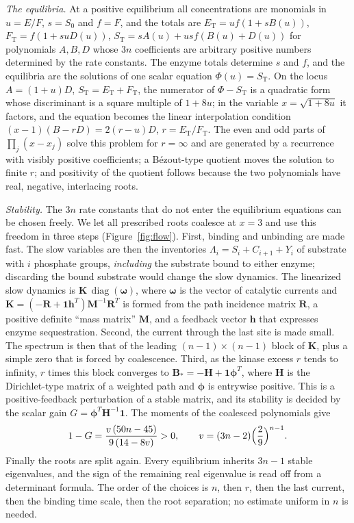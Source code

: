 \documentclass[11pt]{article}
\theoremstyle{plain}
\theoremstyle{definition}
\theoremstyle{remark}
\numberwithin{equation}{section}
\newcommand{\ET}{E_{\mathrm T}}
\newcommand{\FT}{F_{\mathrm T}}
\newcommand{\ST}{S_{\mathrm T}}
\newcommand{\bM}{\mathbf M}
\newcommand{\bR}{\mathbf R}
\newcommand{\bK}{\mathbf K}
\newcommand{\bH}{\mathbf H}
\newcommand{\bB}{\mathbf B}
\newcommand{\one}{\boldsymbol 1}
\newcommand{\bh}{\boldsymbol h}
\newcommand{\bphi}{\boldsymbol\phi}
\newcommand{\bomega}{\boldsymbol\omega}
\DeclareMathOperator{\diag}{diag}
\begin{document}
\emph{The equilibria.} At a positive equilibrium all concentrations are monomials in
\(u=E/F\), \(s=S_0\) and \(f=F\), and the totals are
\(\ET=uf(1+sB(u))\), \(\FT=f(1+suD(u))\), \(\ST=sA(u)+usf(B(u)+D(u))\) for polynomials \(A,B,D\)
whose \(3n\) coefficients are arbitrary positive numbers determined by the rate constants. The
enzyme totals determine \(s\) and \(f\), and the equilibria are the solutions of one scalar
equation \(\Phi(u)=\ST\). On the locus \(A=(1+u)D\), \(\ST=\ET+\FT\), the numerator of
\(\Phi-\ST\) is a quadratic form whose discriminant is a square multiple of \(1+8u\); in the
variable \(x=\sqrt{1+8u}\) it factors, and the equation becomes the linear interpolation
condition \((x-1)(B-rD)=2(r-u)D\), \(r=\ET/\FT\). The even and odd parts of
\(\prod_j(x-x_j)\) solve this problem for \(r=\infty\) and are generated by a recurrence with
visibly positive coefficients; a B\'ezout-type quotient moves the solution to finite \(r\); and
positivity of the quotient follows because the two polynomials have real, negative, interlacing
roots.

\emph{Stability.} The \(3n\) rate constants that do not enter the equilibrium equations can be
chosen freely. We let all prescribed roots coalesce at \(x=3\) and use this freedom in three
steps (Figure~\ref{fig:flow}). First, binding and unbinding are made fast. The slow variables
are then the inventories \(\Lambda_i=S_i+C_{i+1}+Y_i\) of substrate with \(i\) phosphate groups,
\emph{including} the substrate bound to either enzyme; discarding the bound substrate would
change the slow dynamics. The linearized slow dynamics is \(\bK\,\diag(\bomega)\), where
\(\bomega\) is the vector of catalytic currents and
\(\bK=(-\bR+\one\bh^{T})\bM^{-1}\bR^{T}\) is formed from the path incidence matrix \(\bR\), a
positive definite ``mass matrix'' \(\bM\), and a feedback vector \(\bh\) that expresses
enzyme sequestration. Second, the current through the last site is made small. The spectrum
is then that of the leading \((n-1)\times(n-1)\) block of \(\bK\), plus a simple zero that is
forced by coalescence. Third, as the kinase excess \(r\) tends to infinity, \(r\) times this
block converges to \(\bB_*=-\bH+\one\bphi^{T}\), where \(\bH\) is the Dirichlet-type matrix of a
weighted path and \(\bphi\) is entrywise positive. This is a positive-feedback perturbation of a
stable matrix, and its stability is decided by the scalar gain \(G=\bphi^{T}\bH^{-1}\one\). The
moments of the coalesced polynomials give
\[
 1-G=\frac{v\,(50n-45)}{9\,(14-8v)}>0,\qquad v=(3n-2)\Bigl(\frac29\Bigr)^{n-1}.
\]
Finally the roots are split again. Every equilibrium inherits \(3n-1\) stable eigenvalues, and
the sign of the remaining real eigenvalue is read off from a determinant formula. The order of
the choices is \(n\), then \(r\), then the last current, then the binding time scale, then the
root separation; no estimate uniform in \(n\) is needed.
\end{document}
